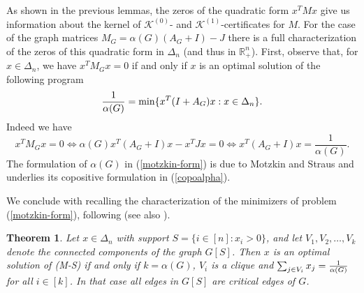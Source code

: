 \documentclass[11pt]{article}
\newcommand{\oR}{{\mathbb R}}
\newtheorem{theorem}{Theorem}[section]
\numberwithin{equation}{section}
\newcommand{\MK}{{\mathcal K}}
\begin{document}
As shown in the previous lemmas, the zeros of the quadratic form $x^TMx$ give us information about the kernel of  $\MK^{(0)}$- and $\MK^{(1)}$-certificates for $M$. For the case of the graph matrices $M_G=\alpha(G)(A_G+I)-J$ there is a full characterization of the zeros of this quadratic form  in  $\Delta_n$ (and thus in $\oR^n_+$). First, observe that, for $x\in \Delta_n$, we have $x^TM_Gx=0$ if and only if $x$ is an optimal solution of the following program
\begin{equation}\label{motzkin-form}
{1\over \alpha(G)}=\min\{x^T (I+A_G)x: x\in \Delta_n\}.
\end{equation}
 Indeed we have
\begin{equation}\label{eq-mini}
x^TM_Gx=0 \Longleftrightarrow \alpha(G)x^T(A_G+I)x -x^TJx=0 \Longleftrightarrow x^T(A_G+I)x =\frac{1}{\alpha(G)}.
\end{equation}
The  formulation of $\alpha(G)$ in (\ref{motzkin-form}) is due to Motzkin and Straus \cite{motzkin} and underlies its copositive formulation in (\ref{copoalpha}).

We conclude with recalling the characterization of the minimizers of problem (\ref{motzkin-form}), following \cite[Corollary 4.4]{LV2021} (see also \cite{GHPR}).


\begin{theorem}\label{minimizers-LV}
Let $x\in \Delta_n$ %
with support $S=\{i\in [n]: x_i>0\}$, and let $V_1, V_2, \dots, V_k$ denote the connected components of the graph $G[S]$. Then $x$ is an optimal solution of (M-S) if and only if $k=\alpha(G)$, $V_i$ is a clique and $\sum_{j\in V_i}x_j={1\over \alpha(G)}$ for all $i\in [k]$. In that case all edges in $G[S]$ are critical edges of $G$.
\end{theorem}



\end{document}
